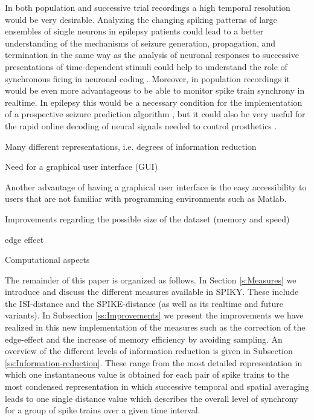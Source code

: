 \documentclass[10pt,twocolumn]{elsart5p}
\begin{document}
In both population and successive trial recordings a high temporal resolution would be very desirable. Analyzing the changing spiking patterns of large ensembles of single neurons in epilepsy patients could lead to a better understanding of the mechanisms of seizure generation, propagation, and termination \citep{Truccolo11, Bower12} in the same way as the analysis of neuronal responses to successive presentations of time-dependent stimuli could help to understand the role of synchronous firing in neuronal coding \citep{Miller08}. Moreover, in population recordings it would be even more advantageous to be able to monitor spike train synchrony in realtime. In epilepsy this would be a necessary condition for the implementation of a prospective seizure prediction algorithm \citep{Mormann07}, but it could also be very useful for the rapid online decoding of neural signals needed to control prosthetics \citep{Hochberg06, Sanchez08}.




Many different representations, i.e. degrees of information reduction


Need for a graphical user interface (GUI)

Another advantage of having a graphical user interface is the easy accessibility to users that are not familiar with programming environments such as Matlab.

Improvements regarding the possible size of the dataset (memory and speed)

edge effect

Computational aspects

The remainder of this paper is organized as follows. In Section \ref{s:Measures} we introduce and discuss the different measures available in SPIKY. These include the ISI-distance and the SPIKE-distance (as well as its realtime and future variants). In Subsection \ref{ss:Improvements} we present the improvements we have realized in this new implementation of the measures such as the correction of the edge-effect and the increase of memory efficiency by avoiding sampling. An overview of the different levels of information reduction is given in Subsection \ref{ss:Information-reduction}. These range from the most detailed representation in which one instantaneous value is obtained for each pair of spike trains to the most condensed representation in which successive temporal and spatial averaging leads to one single distance value which describes the overall level of synchrony for a group of spike trains over a given time interval.
\end{document}
